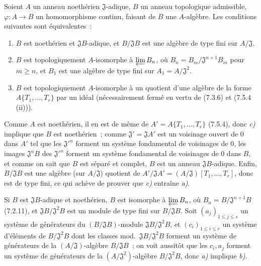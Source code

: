 \begin{proposition}[7.5.5]
\label{0.7.5.5-fr}
Soient $A$ un anneau noethérien $\mathfrak J$-adique, $B$ un anneau topologique
admissible, $\varphi:A\to B$ un homomorphisme continu, faisant de $B$ une
$A$-algèbre. Les conditions suivantes sont équivalentes~:
\begin{enumerate}
  \item[a)] $B$ est noethérien et $\mathfrak JB$-adique, et
  $B/\mathfrak JB$ est une algèbre de type fini sur $A/\mathfrak J$.

  \item[b)] $B$ est topologiquement $A$-isomorphe à $\varprojlim B_n$, où
  $B_n=B_m/\mathfrak J^{n+1}B_m$ pour $m\geq n$, et $B_1$ est une algèbre de
  type fini sur $A_1=A/\mathfrak J^2$.

  \item[c)] $B$ est topologiquement $A$-isomorphe à un quotient d'une algèbre
  de la forme\linebreak $A\{T_1,\ldots,T_r\}$ par un idéal (nécessairement fermé en vertu
  de \textup{(7.3.6)} et \textup{(7.5.4 (ii))}).
\end{enumerate}
\end{proposition}

Comme $A$ est noethérien, il en est de même de
$A'=A\{T_1,\ldots,T_r\}$ (7.5.4), donc \emph{c)} implique que $B$ est noethérien~;
comme $\mathfrak J'=\mathfrak JA'$ est un voisinage ouvert de 0 dans $A'$ tel
que les $\mathfrak J'^{n}$ forment un système fondamental de voisinages de 0,
les images $\mathfrak J^nB$ des $\mathfrak J'^{n}$ forment un système
fondamental de voisinages de 0 dans $B$, et comme on sait que $B$ est séparé et
complet, $B$ est un anneau $\mathfrak JB$-adique. Enfin, $B/\mathfrak JB$ est
une algèbre (sur $A/\mathfrak J$) quotient de
$A'/\mathfrak JA'=(A/\mathfrak J)[T_1,\ldots,T_r]$, donc est de type fini, ce
qui achève de prouver que \emph{c)} entraîne \emph{a)}.

Si $B$ est $\mathfrak JB$-adique et noethérien, $B$ est isomorphe à
$\varprojlim B_n$, où $B_n=B/\mathfrak J^{n+1}B$ (7.2.11), et
$\mathfrak JB/\mathfrak J^2B$ est un module de type fini sur
$B/\mathfrak JB$. Soit $(a_j)_{1\leq j\leq s}$ un système de générateurs du
$(B/\mathfrak JB)$-module $\mathfrak JB/\mathfrak J^2B$, et
$(c_i)_{1\leq i\leq r}$ un système d'éléments de $B/\mathfrak J^2B$ dont les
classes
mod.~$\mathfrak JB/\mathfrak J^2B$ forment un système de générateurs de la
$(A/\mathfrak J)$-algèbre $B/\mathfrak JB$~; on voit aussitôt que les $c_i,a_j$
forment un système de générateurs de la $(A/\mathfrak J^2)$-algèbre
$B/\mathfrak J^2B$, donc \emph{a)} implique \emph{b)}.

